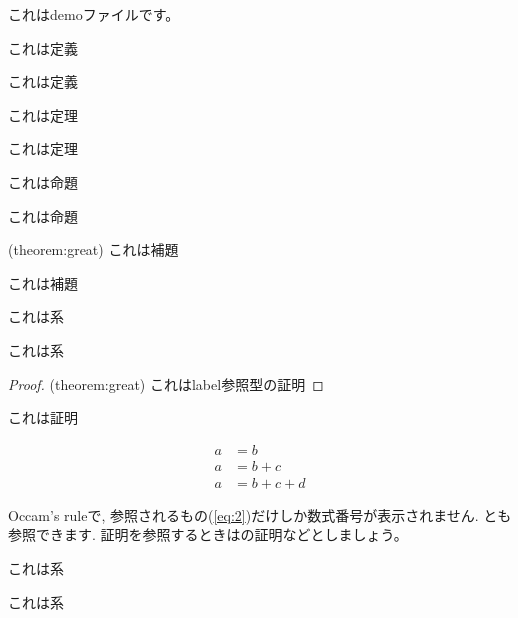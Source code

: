 \documentclass[a4paper]{jsarticle}
\begin{document}
  これはdemoファイルです。

  \begin{definition}[番号あり定義]
    これは定義
  \end{definition}

  \begin{definition*}[番号なし定義]
    これは定義
  \end{definition*}

  \begin{theorem}[番号あり定理]\label{theorem:great}
    これは定理
  \end{theorem}

  \begin{theorem*}[番号なし定理]
    これは定理
  \end{theorem*}

  \begin{proposition}[番号あり命題]
    これは命題
  \end{proposition}

  \begin{proposition*}[番号なし命題]
    これは命題
  \end{proposition*}

  \begin{lemma}[番号あり補題](theorem:great)
    これは補題
  \end{lemma}

  \begin{lemma*}[番号なし補題]
    これは補題
  \end{lemma*}

  \begin{corollary}[番号あり系]
    これは系
  \end{corollary}

  \begin{corollary*}[番号なし系]
    これは系
  \end{corollary*}

  \begin{proof}(theorem:great)\label{proof:great}
    これはlabel参照型の証明
  \end{proof}

  \begin{proof*}
    これは証明
  \end{proof*}
  
  \begin{align}
    a &= b \label{eq:1} \\
    a &= b+c \label{eq:2} \\
    a &= b+c+d \label{eq:3}
  \end{align}
    
  Occam's ruleで, 参照されるもの(\cref{eq:2})だけしか数式番号が表示されません.
  とも参照できます.
  証明を参照するときはの証明などとしましょう。

  \begin{corollary}[番号あり系]
    これは系
  \end{corollary}

  \begin{corollary}[番号あり系]
    これは系
  \end{corollary}
\end{document}
